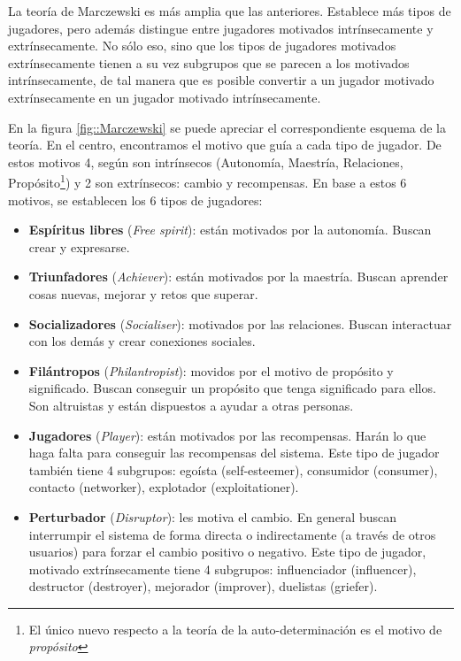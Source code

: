La teoría de Marczewski \cite{marczewski} es más amplia que las anteriores.
%
Establece más tipos de jugadores, pero además distingue entre jugadores motivados intrínsecamente y extrínsecamente.
%
No sólo eso, sino que los tipos de jugadores motivados extrínsecamente tienen a su vez subgrupos que se parecen a los motivados intrínsecamente, de tal manera que es posible convertir a un jugador motivado extrínsecamente en un jugador motivado intrínsecamente.

En la figura \ref{fig::Marczewski} se puede apreciar el correspondiente esquema de la teoría.
%
En el centro, encontramos el motivo que guía a cada tipo de jugador. 
%
De estos motivos 4, según \cite{marczewski} son intrínsecos (Autonomía, Maestría, Relaciones, Propósito\footnote{El único nuevo respecto a la teoría de la auto-determinación \cite{SDT} es el motivo de \textit{propósito}}) y 2 son extrínsecos: cambio y recompensas.
%
En base a estos 6 motivos, se establecen los 6 tipos de jugadores:
%
\begin{itemize}
	\item \textbf{Espíritus libres} (\textit{Free spirit}): están motivados por la autonomía. Buscan crear y expresarse.

	\item \textbf{Triunfadores} (\textit{Achiever}): están motivados por la maestría. 
	Buscan aprender cosas nuevas, mejorar y retos que superar.


	\item \textbf{Socializadores} (\textit{Socialiser}): motivados por las relaciones.
	Buscan interactuar con los demás y crear conexiones sociales.

	\item \textbf{Filántropos} (\textit{Philantropist}): movidos por el motivo de propósito y significado.
	Buscan conseguir un propósito que tenga  significado para ellos.
	Son altruistas y están dispuestos a ayudar a otras personas.


	\item \textbf{Jugadores} (\textit{Player}): están motivados por las recompensas. 
	Harán lo que haga falta para conseguir las recompensas del sistema.
	\subitem Este tipo de jugador también tiene 4 subgrupos: egoísta (self-esteemer), consumidor (consumer), contacto (networker), explotador (exploitationer).

	\item \textbf{Perturbador} (\textit{Disruptor}): les motiva el cambio. En general buscan interrumpir el sistema de forma directa o indirectamente (a través de otros usuarios) para forzar el cambio positivo o negativo.
	\subitem Este tipo de jugador, motivado extrínsecamente tiene 4 subgrupos: influenciador (influencer), destructor (destroyer), mejorador (improver), duelistas (griefer).
\end{itemize}

